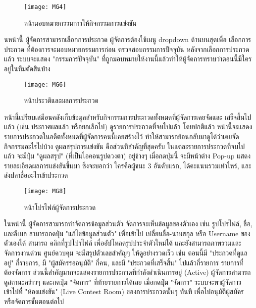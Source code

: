 \vspace{\baselineskip}

\begin{figure}[h]
	\centering
	\texttt{[image: MG4]}
	\caption{หน้ามอบหมายกรรมการให้กิจกรรมการแข่งขัน}
\end{figure}

\indent นหน้านี้ ผู้จัดการสามารถเลือกการประกวด ผู้จัดการต้องใช้เมนู dropdown ด้านบนสุดเพื่อ เลือกการประกวด ที่ต้องการจะมอบหมายกรรมการก่อน ตรวจสอบกรรมการปัจจุบัน หลังจากเลือกการประกวดแล้ว ระบบจะแสดง "กรรมการปัจจุบัน" ที่ถูกมอบหมายให้งานนี้แล้วทำให้ผู้จัดการทราบว่าตอนนี้มีใครอยู่ในทีมตัดสินบ้าง

\newpage

\begin{figure}[h]
	\centering
	\texttt{[image: MG6]}
	\caption{หน้าประวติและผลการประกวด}
\end{figure}

\indent หน้านี้เปรียบเสมือนคลังเก็บข้อมูลสำหรับกิจกรรมการประกวดทั้งหมดที่ผู้จัดการเคยจัดและ เสร็จสิ้นไปแล้ว (เช่น ประกาศผลแล้ว หรือยกเลิกไป) ดูรายการประกวดที่จบไปแล้ว โดยปกติแล้ว หน้านี้จะแสดงรายการประกวดในอดีตทั้งหมดที่ผู้จัดการคนนี้เคยสร้างไว้ ทำให้สามารถย้อนกลับมาดูได้ว่าเคยจัดกิจกรรมอะไรไปบ้าง ดูผลสรุปการแข่งขัน คือส่วนที่สำคัญที่สุดครับ ในแต่ละรายการประกวดที่จบไปแล้ว จะมีปุ่ม "ดูผลสรุป" (ที่เป็นไอคอนรูปดวงตา) อยู่ข้างๆ เมื่อกดปุ่มนี้ จะมีหน้าต่าง Pop-up แสดงรายละเอียดผลการแข่งขันขึ้นมา ซึ่งจะบอกว่า ใครคือผู้ชนะ 3 อันดับแรก, ได้คะแนนรวมเท่าไหร่, และส่งปลาชื่ออะไรเข้าประกวด

\vspace{\baselineskip}

\begin{figure}[h]
	\centering
	\texttt{[image: MG8]}
	\caption{หน้าโปรไฟล์ผู้จัดการประกวด}
\end{figure}

\indent ในหน้านี้ ผู้จัดการสามารถทำจัดการข้อมูลส่วนตัว จัดการจะเห็นข้อมูลของตัวเอง เช่น รูปโปรไฟล์, ชื่อ, และอีเมล สามารถกดปุ่ม "แก้ไขข้อมูลส่วนตัว" เพื่อเข้าไป เปลี่ยนชื่อ-นามสกุล หรือ Username ของตัวเองได้ สามารถ คลิกที่รูปโปรไฟล์ เพื่ออัปโหลดรูปประจำตัวใหม่ได้ และยังสามารถภาพรวมและจัดการงานด่วน  ศูนย์ควบคุม จะมีสรุปตัวเลขสำคัญๆ ให้ดูอย่างรวดเร็ว เช่น ตอนนี้มี "ประกวดที่ดูแลอยู่" กี่รายการ, มี "ผู้สมัครรออนุมัติ" กี่คน, และมี "ประกวดที่เสร็จสิ้น" ไปแล้วกี่รายการ รายการที่ต้องจัดการ ส่วนนี้สำคัญมากจะแสดงรายการประกวดที่กำลังดำเนินการอยู่ (Active) ผู้จัดการสามารถดูสถานะคร่าวๆ และกดปุ่ม "จัดการ" ที่ท้ายรายการได้เลย เมื่อกดปุ่ม "จัดการ" ระบบจะพาผู้จัดการเข้าไปที่ "ห้องแข่งขัน" (Live Contest Room) ของการประกวดนั้นๆ ทันที เพื่อไปอนุมัติผู้สมัครหรือจัดการขั้นตอนต่อไป

\endgroup